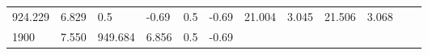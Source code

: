 \documentclass{article}
\begin{document}
\begin{longtable}[]{@{}llllllllllll@{}}
\begin{minipage}[t]{0.06\columnwidth}
924.229\strut
\end{minipage} & \begin{minipage}[t]{0.08\columnwidth}\raggedright\strut
6.829\strut
\end{minipage} & \begin{minipage}[t]{0.03\columnwidth}\raggedright\strut
0.5\strut
\end{minipage} & \begin{minipage}[t]{0.06\columnwidth}\raggedright\strut
-0.69\strut
\end{minipage} & \begin{minipage}[t]{0.03\columnwidth}\raggedright\strut
0.5\strut
\end{minipage} & \begin{minipage}[t]{0.06\columnwidth}\raggedright\strut
-0.69\strut
\end{minipage} & \begin{minipage}[t]{0.06\columnwidth}\raggedright\strut
21.004\strut
\end{minipage} & \begin{minipage}[t]{0.08\columnwidth}\raggedright\strut
3.045\strut
\end{minipage} & \begin{minipage}[t]{0.06\columnwidth}\raggedright\strut
21.506\strut
\end{minipage} & \begin{minipage}[t]{0.09\columnwidth}\raggedright\strut
3.068\strut
\end{minipage}\tabularnewline
\begin{minipage}[t]{0.03\columnwidth}\raggedright\strut
1900\strut
\end{minipage} & \begin{minipage}[t]{0.06\columnwidth}\raggedright\strut
7.550\strut
\end{minipage} & \begin{minipage}[t]{0.06\columnwidth}\raggedright\strut
949.684\strut
\end{minipage} & \begin{minipage}[t]{0.08\columnwidth}\raggedright\strut
6.856\strut
\end{minipage} & \begin{minipage}[t]{0.03\columnwidth}\raggedright\strut
0.5\strut
\end{minipage} & \begin{minipage}[t]{0.06\columnwidth}\raggedright\strut
-0.69\strut
\end{minipage} & \begin{minipage}[t]{0.03\columnwidth}\raggedright\strut

\end{minipage}
\end{longtable}
\end{document}
